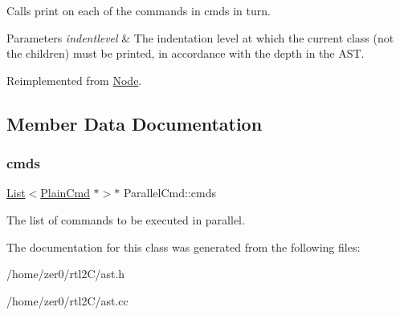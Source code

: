 Calls print on each of the commands in cmds in turn. 
\begin{DoxyParams}{Parameters}
{\em indentlevel} & The indentation level at which the current class (not the children) must be printed, in accordance with the depth in the A\+ST. \\
\hline
\end{DoxyParams}


Reimplemented from \hyperlink{class_node_a3e67ec8d22182b721717af14fe0c3000}{Node}.



\subsection{Member Data Documentation}
\mbox{\label{class_parallel_cmd_af8376052ae9639db51ddf67c4e8dc4b9}} 
\subsubsection{\texorpdfstring{cmds}{cmds}}
{\footnotesize\ttfamily \hyperlink{class_list}{List}$<$\hyperlink{class_plain_cmd}{Plain\+Cmd} $\ast$$>$$\ast$ Parallel\+Cmd\+::cmds\hspace{0.3cm}{\ttfamily [protected]}}

The list of commands to be executed in parallel. 

The documentation for this class was generated from the following files\+:\begin{DoxyCompactItemize}
\item 
/home/zer0/rtl2\+C/ast.\+h\item 
/home/zer0/rtl2\+C/ast.\+cc\end{DoxyCompactItemize}

